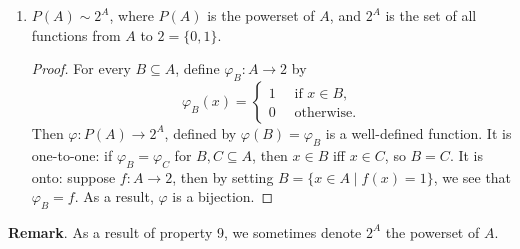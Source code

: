 \documentclass[12pt]{article}
\begin{document}
\begin{enumerate}
\item $P(A)\sim 2^A$, where $P(A)$ is the powerset of $A$, and $2^A$ is the set of all functions from $A$ to $2=\lbrace 0,1\rbrace$.
\begin{proof}  For every $B\subseteq A$, define $\varphi_B:A \to 2$ by 
\begin{displaymath}
\varphi_B(x) = \left\{
\begin{array}{ll}
1 \quad \mbox{ if }x\in B,\\
0 \quad \mbox{ otherwise}.
\end{array}
\right.
\end{displaymath}
Then $\varphi: P(A)\to 2^A$, defined by $\varphi(B)=\varphi_B$ is a well-defined function.  It is one-to-one: if $\varphi_B=\varphi_C$ for $B,C\subseteq A$, then $x\in B$ iff $x\in C$, so $B=C$.  It is onto: suppose $f:A\to 2$, then by setting $B=\lbrace x\in A\mid f(x)=1\rbrace$, we see that $\varphi_B=f$.  As a result, $\varphi$ is a bijection.
\end{proof}
\end{enumerate}

\textbf{Remark}.  As a result of property 9, we sometimes denote $2^A$ the powerset of $A$.
\end{document}
